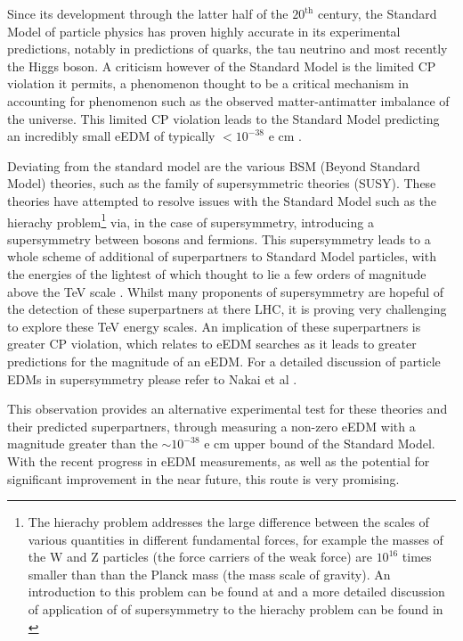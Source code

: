 Since its development through the latter half of the $\text{20}^\text{th}$ century, the Standard Model of particle physics has proven highly accurate in its experimental predictions, notably in predictions of quarks, the tau neutrino and most recently the Higgs boson. A criticism however of the Standard Model is the limited CP violation it permits, a phenomenon thought to be a critical mechanism in accounting for phenomenon such as the observed matter-antimatter imbalance of the universe. This limited CP violation leads to the Standard Model predicting an incredibly small eEDM of typically $< 10^{-38}$ e cm \cite{Pospelov_2005}.

Deviating from the standard model are the various BSM (Beyond Standard Model) theories, such as the family of supersymmetric theories (SUSY). These theories have attempted to resolve issues with the Standard Model such as the hierachy problem\footnote{The hierachy problem addresses the large difference between the scales of various quantities in different fundamental forces, for example the masses of the W and Z particles (the force carriers of the weak force) are $10^{16}$ times smaller than than the Planck mass (the mass scale of gravity). An introduction to this problem can be found at \cite{Strassler_2011} and a more detailed discussion of application of of supersymmetry to the hierachy problem can be found in \cite{Stephen_1998}} via, in the case of supersymmetry, introducing a supersymmetry between bosons and fermions. This supersymmetry leads to a whole scheme of additional of superpartners to Standard Model particles, with the energies of the lightest of which thought to lie a few orders of magnitude above the TeV scale \cite{Stephen_1998}. Whilst many proponents of supersymmetry are hopeful of the detection of these superpartners at there LHC, it is proving very challenging to explore these TeV energy scales. An implication of these superpartners is greater CP violation, which relates to eEDM searches as it leads to greater predictions for the magnitude of an eEDM. For a detailed discussion of particle EDMs in supersymmetry please refer to Nakai et al \cite{Nakai_2017}.

This observation provides an alternative experimental test for these theories and their predicted superpartners, through measuring a non-zero eEDM with a magnitude greater than the $\sim 10^{-38}$ e cm upper bound of the Standard Model. With the recent progress in eEDM measurements, as well as the potential for significant improvement in the near future, this route is very promising.